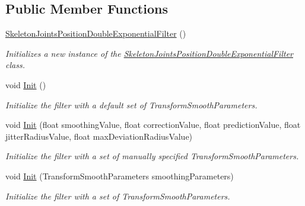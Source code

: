 \subsection*{Public Member Functions}
\begin{DoxyCompactItemize}
\item 
\hyperlink{class_microsoft_1_1_samples_1_1_kinect_1_1_avateering_1_1_filters_1_1_skeleton_joints_position_double_exponential_filter_a115c464c8c6f81e223a1aa1382a3f378}{Skeleton\+Joints\+Position\+Double\+Exponential\+Filter} ()
\begin{DoxyCompactList}\small\item\em Initializes a new instance of the \hyperlink{class_microsoft_1_1_samples_1_1_kinect_1_1_avateering_1_1_filters_1_1_skeleton_joints_position_double_exponential_filter}{Skeleton\+Joints\+Position\+Double\+Exponential\+Filter} class. \end{DoxyCompactList}\item 
void \hyperlink{class_microsoft_1_1_samples_1_1_kinect_1_1_avateering_1_1_filters_1_1_skeleton_joints_position_double_exponential_filter_af77cac1895ff63de0a69d3306c06b00b}{Init} ()
\begin{DoxyCompactList}\small\item\em Initialize the filter with a default set of Transform\+Smooth\+Parameters. \end{DoxyCompactList}\item 
void \hyperlink{class_microsoft_1_1_samples_1_1_kinect_1_1_avateering_1_1_filters_1_1_skeleton_joints_position_double_exponential_filter_a72c4b893a04f0da0a00e7d76fe94a1ab}{Init} (float smoothing\+Value, float correction\+Value, float prediction\+Value, float jitter\+Radius\+Value, float max\+Deviation\+Radius\+Value)
\begin{DoxyCompactList}\small\item\em Initialize the filter with a set of manually specified Transform\+Smooth\+Parameters. \end{DoxyCompactList}\item 
void \hyperlink{class_microsoft_1_1_samples_1_1_kinect_1_1_avateering_1_1_filters_1_1_skeleton_joints_position_double_exponential_filter_ad4161509f17d4ee6809dd8d191dc2c56}{Init} (Transform\+Smooth\+Parameters smoothing\+Parameters)
\begin{DoxyCompactList}\small\item\em Initialize the filter with a set of Transform\+Smooth\+Parameters. \end{DoxyCompactList}\item 

\end{DoxyCompactItemize}
